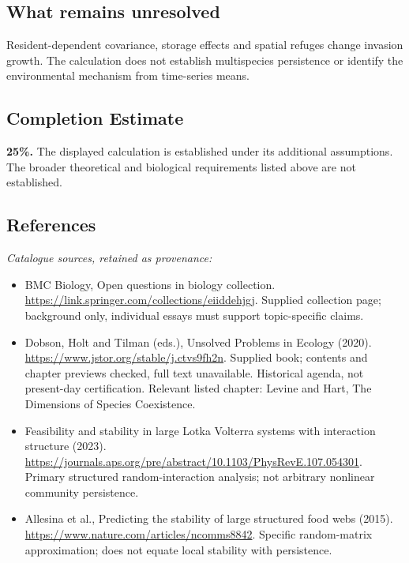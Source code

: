 \documentclass[11pt]{article}
\begin{document}
\subsection{What remains unresolved}
Resident-dependent covariance, storage effects and spatial refuges change invasion growth. The calculation does not establish multispecies persistence or identify the environmental mechanism from time-series means.
\subsection{Completion Estimate}
\textbf{25\%.} The displayed calculation is established under its additional assumptions. The broader theoretical and biological requirements listed above are not established.
\subsection{References}
\noindent\emph{Catalogue sources, retained as provenance:}
\begin{itemize}
\item BMC Biology, Open questions in biology collection. \url{https://link.springer.com/collections/eiiddehjgj}. Supplied collection page; background only, individual essays must support topic-specific claims.
\item Dobson, Holt and Tilman (eds.), Unsolved Problems in Ecology (2020). \url{https://www.jstor.org/stable/j.ctvs9fh2n}. Supplied book; contents and chapter previews checked, full text unavailable. Historical agenda, not present-day certification. Relevant listed chapter: Levine and Hart, The Dimensions of Species Coexistence.
\item Feasibility and stability in large Lotka Volterra systems with interaction structure (2023). \url{https://journals.aps.org/pre/abstract/10.1103/PhysRevE.107.054301}. Primary structured random-interaction analysis; not arbitrary nonlinear community persistence.
\item Allesina et al., Predicting the stability of large structured food webs (2015). \url{https://www.nature.com/articles/ncomms8842}. Specific random-matrix approximation; does not equate local stability with persistence.
\end{itemize}
\clearpage


\appendix
\end{document}
